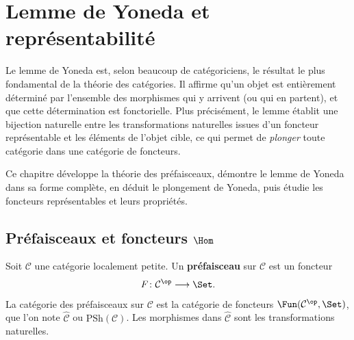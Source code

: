 

\chapter{Lemme de Yoneda et représentabilité}\label{ch:yoneda}
\minitoc

\vspace{1em}

Le lemme de Yoneda est, selon beaucoup de catégoriciens,
le résultat le plus fondamental de la théorie des catégories.
Il affirme qu'un objet est entièrement déterminé
par l'ensemble des morphismes qui y arrivent (ou qui en partent),
et que cette détermination est fonctorielle.
Plus précisément, le lemme établit une bijection naturelle entre les
transformations naturelles issues d'un foncteur représentable et les
éléments de l'objet cible, ce qui permet de \emph{plonger} toute catégorie
dans une catégorie de foncteurs.

Ce chapitre développe la théorie des préfaisceaux, démontre le lemme de Yoneda
dans sa forme complète, en déduit le plongement de Yoneda, puis étudie
les foncteurs représentables et leurs propriétés.


\section{Préfaisceaux et foncteurs \texorpdfstring{$\Hom$}{Hom}}\label{sec:prefaisceaux}

\begin{definition}[Préfaisceau]\label{def:prefaisceau}
Soit $\mathcal{C}$ une catégorie localement petite.
Un \textbf{préfaisceau} sur $\mathcal{C}$ est un foncteur
\[
    F \colon \mathcal{C}^{\op} \longrightarrow \Set.
\]
La catégorie des préfaisceaux sur $\mathcal{C}$ est la catégorie de foncteurs
$\Fun(\mathcal{C}^{\op}, \Set)$,
que l'on note $\widehat{\mathcal{C}}$ ou $\mathrm{PSh}(\mathcal{C})$.
Les morphismes dans $\widehat{\mathcal{C}}$ sont les transformations naturelles.
\end{definition}

